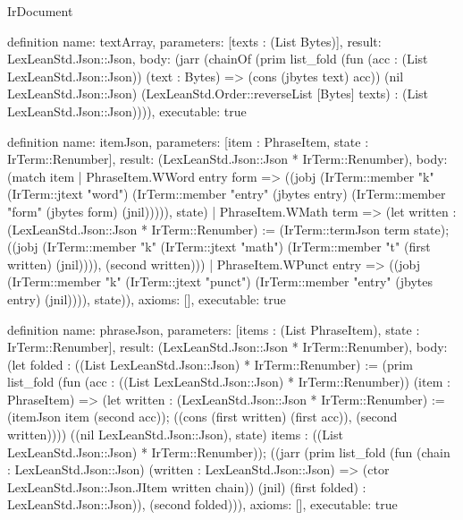 \begin{lexlean}{IrDocument}
\begin{semanticmodule}
definition{
  name: textArray,
  parameters: [texts : (List Bytes)],
  result: LexLeanStd.Json::Json,
  body: (jarr (chainOf (prim list_fold (fun (acc : (List LexLeanStd.Json::Json)) (text : Bytes) => (cons (jbytes text) acc)) (nil LexLeanStd.Json::Json) (LexLeanStd.Order::reverseList [Bytes] texts) : (List LexLeanStd.Json::Json)))),
  executable: true
}

definition{
  name: itemJson,
  parameters: [item : PhraseItem, state : IrTerm::Renumber],
  result: (LexLeanStd.Json::Json * IrTerm::Renumber),
  body: (match item
    | PhraseItem.WWord entry form => ((jobj (IrTerm::member "k" (IrTerm::jtext "word") (IrTerm::member "entry" (jbytes entry) (IrTerm::member "form" (jbytes form) (jnil))))), state)
    | PhraseItem.WMath term => (let written : (LexLeanStd.Json::Json * IrTerm::Renumber) := (IrTerm::termJson term state); ((jobj (IrTerm::member "k" (IrTerm::jtext "math") (IrTerm::member "t" (first written) (jnil)))), (second written)))
    | PhraseItem.WPunct entry => ((jobj (IrTerm::member "k" (IrTerm::jtext "punct") (IrTerm::member "entry" (jbytes entry) (jnil)))), state)),
  axioms: [],
  executable: true
}

definition{
  name: phraseJson,
  parameters: [items : (List PhraseItem), state : IrTerm::Renumber],
  result: (LexLeanStd.Json::Json * IrTerm::Renumber),
  body: (let folded : ((List LexLeanStd.Json::Json) * IrTerm::Renumber) := (prim list_fold (fun (acc : ((List LexLeanStd.Json::Json) * IrTerm::Renumber)) (item : PhraseItem) => (let written : (LexLeanStd.Json::Json * IrTerm::Renumber) := (itemJson item (second acc)); ((cons (first written) (first acc)), (second written)))) ((nil LexLeanStd.Json::Json), state) items : ((List LexLeanStd.Json::Json) * IrTerm::Renumber)); ((jarr (prim list_fold (fun (chain : LexLeanStd.Json::Json) (written : LexLeanStd.Json::Json) => (ctor LexLeanStd.Json::Json.JItem written chain)) (jnil) (first folded) : LexLeanStd.Json::Json)), (second folded))),
  axioms: [],
  executable: true
}


\end{semanticmodule}
\end{lexlean}
